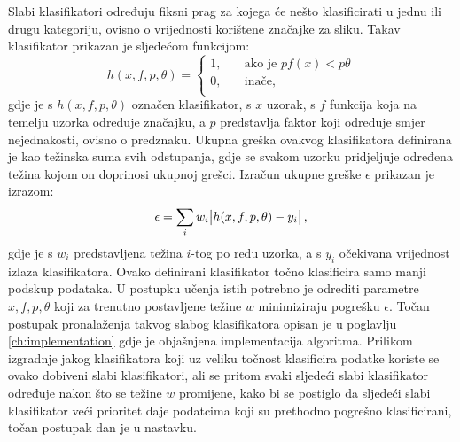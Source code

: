 \documentclass[times, utf8, zavrsni, numeric]{fer}
\begin{document}
Slabi klasifikatori određuju fiksni prag za kojega će nešto klasificirati u jednu ili drugu kategoriju, ovisno o vrijednosti korištene značajke za sliku. Takav klasifikator prikazan je sljedećom funkcijom:
\[
    h(x, f, p, \theta) = 
    \begin{cases}
    1,  & \quad \text{ako je } pf(x) < p\theta \\
    0,  & \quad \text{inače},\\
    \end{cases}
\]
gdje je s $h(x, f, p, \theta)$ označen klasifikator, s $x$ uzorak, s $f$ funkcija koja na temelju uzorka određuje značajku, a $p$ predstavlja faktor koji određuje smjer nejednakosti, ovisno o predznaku.
Ukupna greška ovakvog klasifikatora definirana je kao težinska suma svih odstupanja, gdje se svakom uzorku pridjeljuje određena težina kojom on doprinosi ukupnoj grešci.
Izračun ukupne greške $\epsilon$ prikazan je izrazom:
\[
    \epsilon = \displaystyle \sum_{i}w_i \abs{h(x, f, p, \theta) - y_i}, 
\]
gdje je s $w_i$ predstavljena težina $i$-tog po redu uzorka, a s $y_i$ očekivana vrijednost izlaza klasifikatora.
Ovako definirani klasifikator točno klasificira samo manji podskup podataka.
U postupku učenja istih potrebno je odrediti parametre $x, f, p, \theta$ koji za trenutno postavljene težine $w$ minimiziraju pogrešku $\epsilon$. 
Točan postupak pronalaženja takvog slabog klasifikatora opisan je u poglavlju \ref{ch:implementation} gdje je objašnjena implementacija algoritma.
Prilikom izgradnje jakog klasifikatora koji uz veliku točnost klasificira podatke koriste se ovako dobiveni slabi klasifikatori, ali se pritom svaki sljedeći slabi klasifikator određuje nakon što se težine $w$ promijene, kako bi se postiglo da sljedeći slabi klasifikator veći prioritet daje podatcima koji su prethodno pogrešno klasificirani, točan postupak dan je u nastavku.\\
\end{document}

